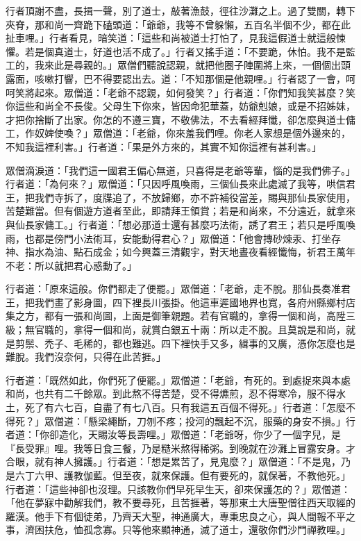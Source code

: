 行者頂謝不盡，長揖一聲，別了道士，敲著漁鼓，徑往沙灘之上。過了雙關，轉下夾脊，那和尚一齊跪下磕頭道：「爺爺，我等不曾躲懶，五百名半個不少，都在此扯車哩。」行者看見，暗笑道：「這些和尚被道士打怕了，見我這假道士就這般悚懼。若是個真道士，好道也活不成了。」行者又搖手道：「不要跪，休怕。我不是監工的，我來此是尋親的。」眾僧們聽說認親，就把他圈子陣圍將上來，一個個出頭露面，咳嗽打響，巴不得要認出去。道：「不知那個是他親哩。」行者認了一會，呵呵笑將起來。眾僧道：「老爺不認親，如何發笑？」行者道：「你們知我笑甚麼？笑你這些和尚全不長俊。父母生下你來，皆因命犯華蓋，妨爺剋娘，或是不招姊妹，才把你捨斷了出家。你怎的不遵三寶，不敬佛法，不去看經拜懺，卻怎麼與道士傭工，作奴婢使喚？」眾僧道：「老爺，你來羞我們哩。你老人家想是個外邊來的，不知我這裡利害。」行者道：「果是外方來的，其實不知你這裡有甚利害。」

眾僧滴淚道：「我們這一國君王偏心無道，只喜得是老爺等輩，惱的是我們佛子。」行者道：「為何來？」眾僧道：「只因呼風喚雨，三個仙長來此處滅了我等，哄信君王，把我們寺拆了，度牒追了，不放歸鄉，亦不許補役當差，賜與那仙長家使用，苦楚難當。但有個遊方道者至此，即請拜王領賞；若是和尚來，不分遠近，就拿來與仙長家傭工。」行者道：「想必那道士還有甚麼巧法術，誘了君王；若只是呼風喚雨，也都是傍門小法術耳，安能動得君心？」眾僧道：「他會摶砂煉汞、打坐存神、指水為油、點石成金；如今興蓋三清觀宇，對天地晝夜看經懺悔，祈君王萬年不老：所以就把君心惑動了。」

行者道：「原來這般。你們都走了便罷。」眾僧道：「老爺，走不脫。那仙長奏准君王，把我們畫了影身圖，四下裡長川張掛。他這車遲國地界也寬，各府州縣鄉村店集之方，都有一張和尚圖，上面是御筆親題。若有官職的，拿得一個和尚，高陞三級；無官職的，拿得一個和尚，就賞白銀五十兩：所以走不脫。且莫說是和尚，就是剪鬃、禿子、毛稀的，都也難逃。四下裡快手又多，緝事的又廣，憑你怎麼也是難脫。我們沒奈何，只得在此苦捱。」

行者道：「既然如此，你們死了便罷。」眾僧道：「老爺，有死的。到處捉來與本處和尚，也共有二千餘眾。到此熬不得苦楚，受不得爊煎，忍不得寒冷，服不得水土，死了有六七百，自盡了有七八百。只有我這五百個不得死。」行者道：「怎麼不得死？」眾僧道：「懸梁繩斷，刀刎不疼；投河的飄起不沉，服藥的身安不損。」行者道：「你卻造化，天賜汝等長壽哩。」眾僧道：「老爺呀，你少了一個字兒，是『長受罪』哩。我等日食三餐，乃是糙米熬得稀粥。到晚就在沙灘上冒露安身。才合眼，就有神人擁護。」行者道：「想是累苦了，見鬼麼？」眾僧道：「不是鬼，乃是六丁六甲、護教伽藍。但至夜，就來保護。但有要死的，就保著，不教他死。」行者道：「這些神卻也沒理。只該教你們早死早生天，卻來保護怎的？」眾僧道：「他在夢寐中勸解我們，教不要尋死，且苦捱著，等那東土大唐聖僧往西天取經的羅漢。他手下有個徒弟，乃齊天大聖，神通廣大，專秉忠良之心，與人間報不平之事，濟困扶危，恤孤念寡。只等他來顯神通，滅了道士，還敬你們沙門禪教哩。」

